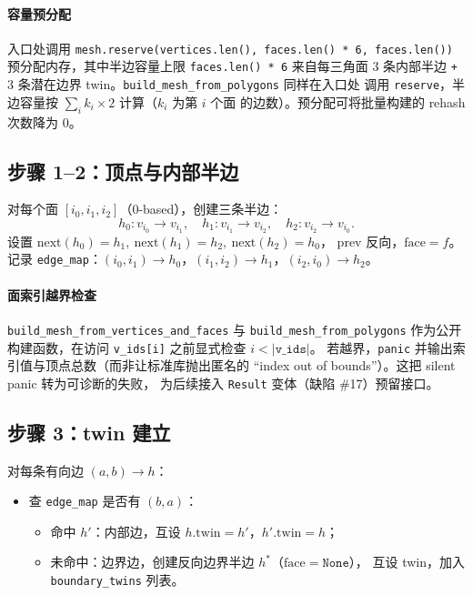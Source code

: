 \documentclass[11pt,a4paper]{article}
\begin{document}
\paragraph{容量预分配}
入口处调用 \texttt{mesh.reserve(vertices.len(), faces.len() * 6, faces.len())}
预分配内存，其中半边容量上限 \texttt{faces.len() * 6} 来自每三角面 3 条内部半边
\texttt{+} 3 条潜在边界 twin。\texttt{build\_mesh\_from\_polygons} 同样在入口处
调用 \texttt{reserve}，半边容量按 $\sum_i k_i \times 2$ 计算（$k_i$ 为第 $i$ 个面
的边数）。预分配可将批量构建的 rehash 次数降为 0。

\subsection{步骤 1--2：顶点与内部半边}

对每个面 $[i_0, i_1, i_2]$（0-based），创建三条半边：
\[
  h_0: v_{i_0} \to v_{i_1}, \quad
  h_1: v_{i_1} \to v_{i_2}, \quad
  h_2: v_{i_2} \to v_{i_0}.
\]
设置 $\mathrm{next}(h_0)=h_1,\ \mathrm{next}(h_1)=h_2,\ \mathrm{next}(h_2)=h_0$，
$\mathrm{prev}$ 反向，$\mathrm{face} = f$。
记录 \texttt{edge\_map}：$(i_0, i_1) \to h_0$，$(i_1, i_2) \to h_1$，$(i_2, i_0) \to h_2$。

\paragraph{面索引越界检查}
\texttt{build\_mesh\_from\_vertices\_and\_faces} 与 \texttt{build\_mesh\_from\_polygons}
作为公开构建函数，在访问 \texttt{v\_ids[i]} 之前显式检查 $i < |\texttt{v\_ids}|$。
若越界，\texttt{panic} 并输出索引值与顶点总数（而非让标准库抛出匿名的
``index out of bounds''）。这把 silent panic 转为可诊断的失败，
为后续接入 \texttt{Result} 变体（缺陷 \#17）预留接口。

\subsection{步骤 3：twin 建立}

对每条有向边 $(a, b) \to h$：
\begin{itemize}
  \item 查 \texttt{edge\_map} 是否有 $(b, a)$：
    \begin{itemize}
      \item 命中 $h'$：内部边，互设 $h.\mathrm{twin} = h'$，$h'.\mathrm{twin} = h$；
      \item 未命中：边界边，创建反向边界半边 $h^*$（$\mathrm{face} = \texttt{None}$），
            互设 twin，加入 \texttt{boundary\_twins} 列表。
    \end{itemize}
\end{itemize}
\end{document}
